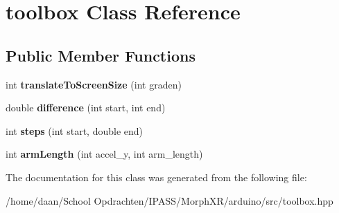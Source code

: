 \hypertarget{classtoolbox}{}\section{toolbox Class Reference}
\label{classtoolbox}
\subsection*{Public Member Functions}
\begin{DoxyCompactItemize}
\item 
\mbox{\label{classtoolbox_a59244902aefc121a12afec6baa8e1e87}} 
int {\bfseries translate\+To\+Screen\+Size} (int graden)
\item 
\mbox{\label{classtoolbox_a99cefed812481a44f45bd795d1c4c1f2}} 
double {\bfseries difference} (int start, int end)
\item 
\mbox{\label{classtoolbox_a4917b28e63e41f052b25297e4d77f2b9}} 
int {\bfseries steps} (int start, double end)
\item 
\mbox{\label{classtoolbox_a9a2412a49c1268f8413c1fb580edc042}} 
int {\bfseries arm\+Length} (int accel\+\_\+y, int arm\+\_\+length)
\end{DoxyCompactItemize}


The documentation for this class was generated from the following file\+:\begin{DoxyCompactItemize}
\item 
/home/daan/\+School Opdrachten/\+I\+P\+A\+S\+S/\+Morph\+X\+R/arduino/src/toolbox.\+hpp\end{DoxyCompactItemize}
